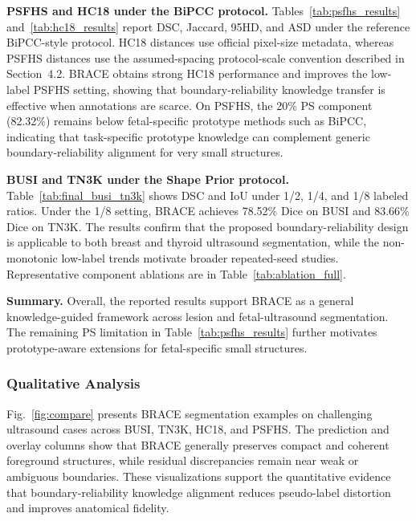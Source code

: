 \documentclass[a4paper,fleqn]{cas-dc}
\begin{document}
\noindent\textbf{PSFHS and HC18 under the BiPCC protocol.} Tables~\ref{tab:psfhs_results} and~\ref{tab:hc18_results} report DSC, Jaccard, 95HD, and ASD under the reference BiPCC-style protocol. HC18 distances use official pixel-size metadata, whereas PSFHS distances use the assumed-spacing protocol-scale convention described in Section~4.2. BRACE obtains strong HC18 performance and improves the low-label PSFHS setting, showing that boundary-reliability knowledge transfer is effective when annotations are scarce. On PSFHS, the 20\% PS component (82.32\%) remains below fetal-specific prototype methods such as BiPCC, indicating that task-specific prototype knowledge can complement generic boundary-reliability alignment for very small structures.

\textbf{BUSI and TN3K under the Shape Prior protocol.} Table~\ref{tab:final_busi_tn3k} shows DSC and IoU under 1/2, 1/4, and 1/8 labeled ratios. Under the 1/8 setting, BRACE achieves 78.52\% Dice on BUSI and 83.66\% Dice on TN3K. The results confirm that the proposed boundary-reliability design is applicable to both breast and thyroid ultrasound segmentation, while the non-monotonic low-label trends motivate broader repeated-seed studies. Representative component ablations are in Table~\ref{tab:ablation_full}.

\textbf{Summary.} Overall, the reported results support BRACE as a general knowledge-guided framework across lesion and fetal-ultrasound segmentation. The remaining PS limitation in Table~\ref{tab:psfhs_results} further motivates prototype-aware extensions for fetal-specific small structures.

\subsubsection{Qualitative Analysis}

Fig.~\ref{fig:compare} presents BRACE segmentation examples on challenging ultrasound cases across BUSI, TN3K, HC18, and PSFHS. The prediction and overlay columns show that BRACE generally preserves compact and coherent foreground structures, while residual discrepancies remain near weak or ambiguous boundaries. These visualizations support the quantitative evidence that boundary-reliability knowledge alignment reduces pseudo-label distortion and improves anatomical fidelity.
\end{document}
